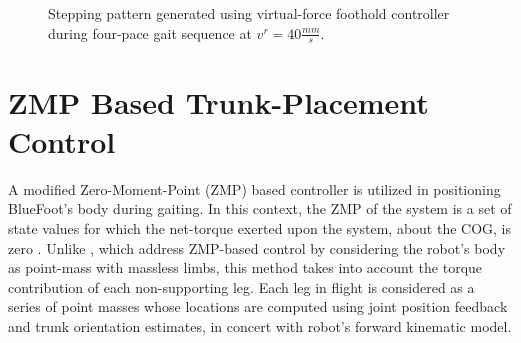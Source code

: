 			\begin{figure}[!h]
				\centering
				\caption{Stepping pattern generated using virtual-force foothold controller during four-pace gait sequence at $v^{r}=40\frac{mm}{s}$.}
				\label{fig::foot_motion4}
			\end{figure}
%



	\section{ZMP Based Trunk-Placement Control}

		A  modified Zero-Moment-Point (ZMP) based controller is utilized in positioning BlueFoot's body during gaiting. In this context, the ZMP of the system is a set of state values for which the net-torque exerted upon the system, about the COG, is zero \cite{Kajita2003,Katie2009}. Unlike \cite{Takanishi1989,Kurazume2003}, which address ZMP-based control by considering the robot's body as point-mass with massless limbs, this method takes into account the torque contribution of each non-supporting leg. Each leg in flight is considered as a series of point masses whose locations are computed using joint position feedback and trunk orientation estimates, in concert with robot's forward kinematic model.
		
